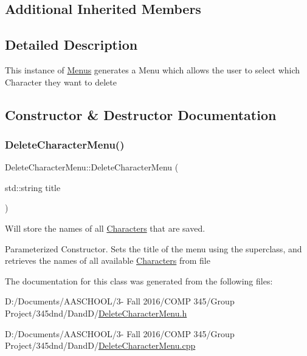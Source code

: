 \subsection*{Additional Inherited Members}


\subsection{Detailed Description}
This instance of \hyperlink{class_menus}{Menus} generates a Menu which allows the user to select which Character they want to delete 

\subsection{Constructor \& Destructor Documentation}
\hypertarget{class_delete_character_menu_a3daa39ddda1956cc8615e0319bd4ebfc}{}\label{class_delete_character_menu_a3daa39ddda1956cc8615e0319bd4ebfc} 
\subsubsection{\texorpdfstring{Delete\+Character\+Menu()}{DeleteCharacterMenu()}}
{\footnotesize\ttfamily Delete\+Character\+Menu\+::\+Delete\+Character\+Menu (\begin{DoxyParamCaption}\item[{std\+::string}]{title }\end{DoxyParamCaption})}



Will store the names of all \hyperlink{class_characters}{Characters} that are saved. 

Parameterized Constructor. Sets the title of the menu using the superclass, and retrieves the names of all available \hyperlink{class_characters}{Characters} from file 

The documentation for this class was generated from the following files\+:\begin{DoxyCompactItemize}
\item 
D\+:/\+Documents/\+A\+A\+S\+C\+H\+O\+O\+L/3-\/ Fall 2016/\+C\+O\+M\+P 345/\+Group Project/345dnd/\+Dand\+D/\hyperlink{_delete_character_menu_8h}{Delete\+Character\+Menu.\+h}\item 
D\+:/\+Documents/\+A\+A\+S\+C\+H\+O\+O\+L/3-\/ Fall 2016/\+C\+O\+M\+P 345/\+Group Project/345dnd/\+Dand\+D/\hyperlink{_delete_character_menu_8cpp}{Delete\+Character\+Menu.\+cpp}\end{DoxyCompactItemize}
